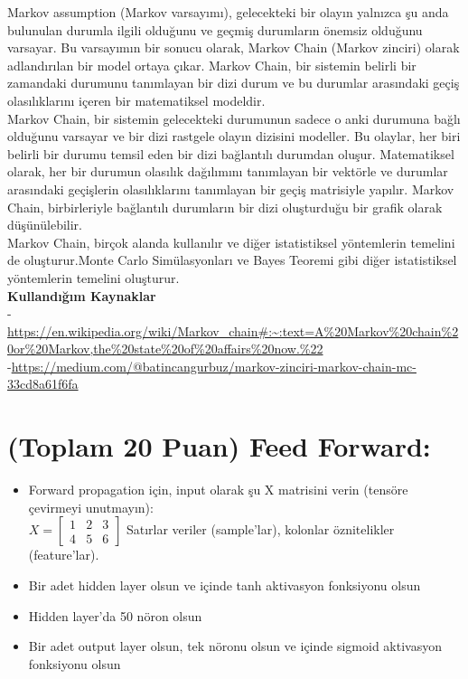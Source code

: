 \documentclass[11pt]{article}
\begin{document}
Markov assumption (Markov varsayımı), gelecekteki bir olayın yalnızca şu anda bulunulan durumla ilgili olduğunu ve geçmiş durumların önemsiz olduğunu varsayar. Bu varsayımın bir sonucu olarak, Markov Chain (Markov zinciri) olarak adlandırılan bir model ortaya çıkar. Markov Chain, bir sistemin belirli bir zamandaki durumunu tanımlayan bir dizi durum ve bu durumlar arasındaki geçiş olasılıklarını içeren bir matematiksel modeldir.\\
Markov Chain, bir sistemin gelecekteki durumunun sadece o anki durumuna bağlı olduğunu varsayar ve bir dizi rastgele olayın dizisini modeller. Bu olaylar, her biri belirli bir durumu temsil eden bir dizi bağlantılı durumdan oluşur. Matematiksel olarak, her bir durumun olasılık dağılımını tanımlayan bir vektörle ve durumlar arasındaki geçişlerin olasılıklarını tanımlayan bir geçiş matrisiyle yapılır. Markov Chain, birbirleriyle bağlantılı durumların bir dizi oluşturduğu bir grafik olarak düşünülebilir. \\
Markov Chain, birçok alanda kullanılır ve diğer istatistiksel yöntemlerin temelini de oluşturur.Monte Carlo Simülasyonları ve Bayes Teoremi gibi diğer istatistiksel yöntemlerin temelini oluşturur.\\
\textbf{Kullandığım Kaynaklar}\\
- \url{https://en.wikipedia.org/wiki/Markov_chain#:~:text=A%20Markov%20chain%20or%20Markov,the%20state%20of%20affairs%20now.%22}\\
-\url{https://medium.com/@batincangurbuz/markov-zinciri-markov-chain-mc-33cd8a61f6fa}

\section{(Toplam 20 Puan) Feed Forward:}
 
\begin{itemize}
    \item Forward propagation için, input olarak şu X matrisini verin (tensöre çevirmeyi unutmayın):\\
    $X = \begin{bmatrix}
        1 & 2 & 3\\
        4 & 5 & 6
        \end{bmatrix}$
    Satırlar veriler (sample'lar), kolonlar öznitelikler (feature'lar).
    \item Bir adet hidden layer olsun ve içinde tanh aktivasyon fonksiyonu olsun
    \item Hidden layer'da 50 nöron olsun
    \item Bir adet output layer olsun, tek nöronu olsun ve içinde sigmoid aktivasyon fonksiyonu olsun
\end{itemize}
\end{document}
